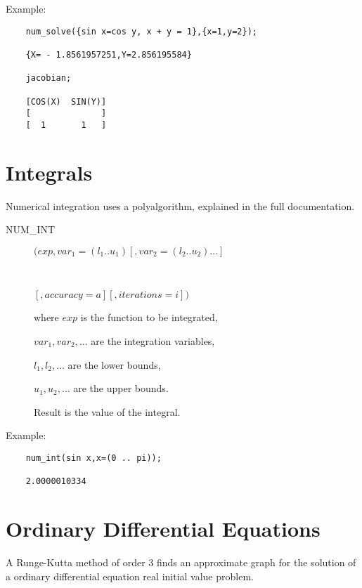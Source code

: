 Example:

\begin{verbatim}
    num_solve({sin x=cos y, x + y = 1},{x=1,y=2});

    {X= - 1.8561957251,Y=2.856195584}

    jacobian;

    [COS(X)  SIN(Y)]
    [              ]
    [  1       1   ]
\end{verbatim}

\section{Integrals}

Numerical integration uses a polyalgorithm, explained in the full
documentation.

\begin{description}
\item[NUM\_INT] $(exp,var_1=(l_1 .. u_1)[,var_2=(l_2 .. u_2)\ldots]$
\item[\ \ \ \ \ \ ]$[,accuracy=a][,iterations=i])$

where $exp$ is the function to be integrated,

$var_1, var_2 , \ldots$ are the integration variables,

$l_1, l_2 , \ldots$ are the lower bounds,

$u_1, u_2 , \ldots$ are the upper bounds.

Result is the value of the integral.

\end{description}

Example:

\begin{verbatim}
    num_int(sin x,x=(0 .. pi));

    2.0000010334
\end{verbatim}

\section{Ordinary Differential Equations}

A Runge-Kutta method of order 3 finds an approximate graph for
the solution of a ordinary differential equation
real initial value problem.

